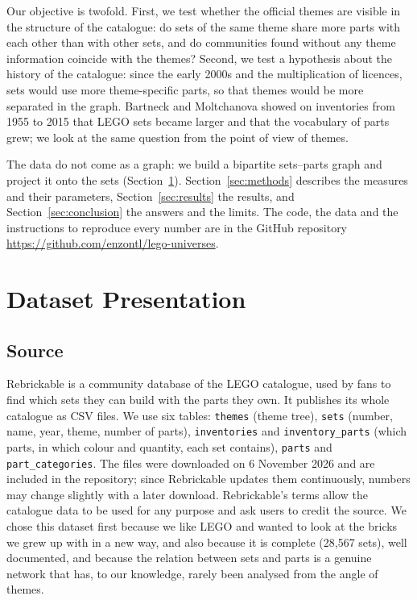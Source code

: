 \documentclass[10pt,a4paper]{article}
\newcommand{\repo}{\url{https://github.com/enzontl/lego-universes}}
\begin{document}
Our objective is twofold. First, we test whether the official themes are
visible in the structure of the catalogue: do sets of the same theme share
more parts with each other than with other sets, and do communities found
without any theme information coincide with the themes? Second, we test a
hypothesis about the history of the catalogue: since the early 2000s and the
multiplication of licences, sets would use more theme-specific parts, so that
themes would be more separated in the graph. Bartneck and Moltchanova
\cite{bartneck2018} showed on inventories from 1955 to 2015 that LEGO sets
became larger and that the vocabulary of parts grew; we look at the same
question from the point of view of themes.

The data do not come as a graph: we build a bipartite sets--parts graph and
project it onto the sets (Section~\ref{sec:data}). Section~\ref{sec:methods}
describes the measures and their parameters, Section~\ref{sec:results} the
results, and Section~\ref{sec:conclusion} the answers and the limits. The code,
the data and the instructions to reproduce every number are in the GitHub
repository \repo.

\section{Dataset Presentation}
\label{sec:data}

\subsection{Source}

Rebrickable \cite{rebrickable} is a community database of the LEGO catalogue,
used by fans to find which sets they can build with the parts they own. It
publishes its whole catalogue as CSV files. We use six tables: \texttt{themes}
(theme tree), \texttt{sets} (number, name, year, theme, number of parts),
\texttt{inventories} and \texttt{inventory\_parts} (which parts, in which
colour and quantity, each set contains), \texttt{parts} and
\texttt{part\_categories}. The files were downloaded on 6 November 2026 and are
included in the repository; since Rebrickable updates them continuously,
numbers may change slightly with a later download. Rebrickable's terms allow
the catalogue data to be used for any purpose and ask users to credit the
source. We chose this dataset first because we like LEGO and wanted to look at
the bricks we grew up with in a new way, and also because it is complete
(28,567 sets), well documented, and because the relation between sets and
parts is a genuine network that has, to our knowledge, rarely been analysed
from the angle of themes.
\end{document}
